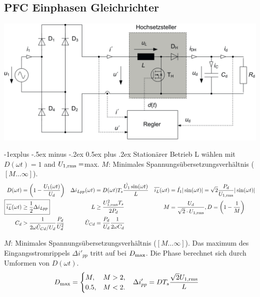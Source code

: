 \documentclass[10pt,landscape]{scrartcl}
\makeatletter
\renewcommand{\subsection}{\@startsection{subsection}{2}{0mm}%
                                {-1explus -.5ex minus -.2ex}%
                                {0.5ex plus .2ex}%
                                {\normalfont\normalsize\bfseries}}
\makeatother
\begin{document}
\begin{multicols}{2}
\vfill\null
\columnbreak
\section{PFC Einphasen Gleichrichter}

\begin{center}
\includegraphics[width=0.8\linewidth]{img/sch_pfc.png}%
\end{center}

\subsection{Stationärer Betrieb}
L wählen mit $D(\omega t)=1$ and $U_{1,\textup{rms}}=$max. $M$: Minimales Spannungsübersetzungsverhältnis ($[M\dots\infty]$).
\begin{align*}
  D(\omega t) &= \left(1-\frac{U_1(\omega t)}{U_d}\right) & 
  \Delta i_{Lpp} (\omega t) &= D(\omega t) T_s \frac{\hat{U_1}\sin(\omega t)}{L} &
  \overline{i_L}(\omega t) &= \hat{I_1} |\sin(\omega t)| = \sqrt{2} \frac{P_d}{U_{1,\textup{rms}}}|\sin(\omega t)| \\
  \Aboxed {\overline{i_L}(\omega t) &\geq \frac{1}{2}\Delta i_{Lpp}} &
  L &\geq \frac{U_{1,\textup{rms}}^2T_s}{2P_d} &
  M &= \frac{U_d}{\sqrt{2} \cdot U_{1,\textup{rms}} }, D=\left(1-\frac{1}{M}\right) \\
  C_d &> \frac{1}{2\omega\hat{U}_{Cd}/U_d}\frac{P_d}{U_d^2} &
  \hat{U}_{Cd} &= \frac{P_d}{U_d}\frac{1}{2\omega C_d}
\end{align*}

$M$: Minimales Spannungsübersetzungsverhältnis ($[M\dots\infty]$). Das maximum des Eingangsstromrippels $\Delta i'_{pp}$ tritt auf bei $D_{\textup{max}}$. Die Phase berechnet sich durch Umformen von $D(\omega t)$.
\begin{align*}
  D_{\textup{max}} &= \begin{cases} M, & M > 2,\\ 0.5, &M < 2. \end{cases} &
  \Delta i'_{pp} &= DT_s\frac{\sqrt{2}U_{1,\textup{rms}}}{L} &
\end{align*}


\end{multicols}
\end{document}
